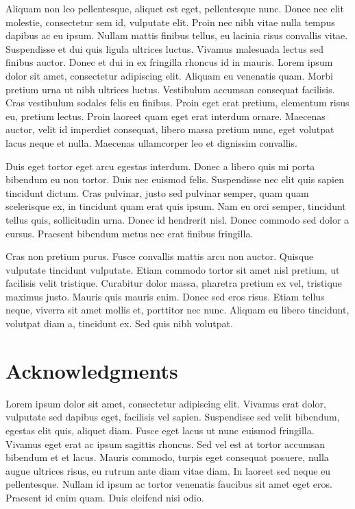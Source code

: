 \documentclass[11pt,english,]{memoir}
\begin{document}
Aliquam non leo pellentesque, aliquet est eget, pellentesque nunc. Donec nec elit molestie, consectetur sem id, vulputate elit. Proin nec nibh vitae nulla tempus dapibus ac eu ipsum. Nullam mattis finibus tellus, eu lacinia risus convallis vitae. Suspendisse et dui quis ligula ultrices luctus. Vivamus malesuada lectus sed finibus auctor. Donec et dui in ex fringilla rhoncus id in mauris. Lorem ipsum dolor sit amet, consectetur adipiscing elit. Aliquam eu venenatis quam. Morbi pretium urna ut nibh ultrices luctus. Vestibulum accumsan consequat facilisis. Cras vestibulum sodales felis eu finibus. Proin eget erat pretium, elementum risus eu, pretium lectus. Proin laoreet quam eget erat interdum ornare. Maecenas auctor, velit id imperdiet consequat, libero massa pretium nunc, eget volutpat lacus neque et nulla. Maecenas ullamcorper leo et dignissim convallis.

Duis eget tortor eget arcu egestas interdum. Donec a libero quis mi porta bibendum eu non tortor. Duis nec euismod felis. Suspendisse nec elit quis sapien tincidunt dictum. Cras pulvinar, justo sed pulvinar semper, quam quam scelerisque ex, in tincidunt quam erat quis ipsum. Nam eu orci semper, tincidunt tellus quis, sollicitudin urna. Donec id hendrerit nisl. Donec commodo sed dolor a cursus. Praesent bibendum metus nec erat finibus fringilla.

Cras non pretium purus. Fusce convallis mattis arcu non auctor. Quisque vulputate tincidunt vulputate. Etiam commodo tortor sit amet nisl pretium, ut facilisis velit tristique. Curabitur dolor massa, pharetra pretium ex vel, tristique maximus justo. Mauris quis mauris enim. Donec sed eros risus. Etiam tellus neque, viverra sit amet mollis et, porttitor nec nunc. Aliquam eu libero tincidunt, volutpat diam a, tincidunt ex. Sed quis nibh volutpat.

\hypertarget{acknowledgments}{%
\chapter*{Acknowledgments}\label{acknowledgments}}


Lorem ipsum dolor sit amet, consectetur adipiscing elit. Vivamus erat dolor, vulputate sed dapibus eget, facilisis vel sapien. Suspendisse sed velit bibendum, egestas elit quis, aliquet diam. Fusce eget lacus ut nunc euismod fringilla. Vivamus eget erat ac ipsum sagittis rhoncus. Sed vel est at tortor accumsan bibendum et et lacus. Mauris commodo, turpis eget consequat posuere, nulla augue ultrices risus, eu rutrum ante diam vitae diam. In laoreet sed neque eu pellentesque. Nullam id ipsum ac tortor venenatis faucibus sit amet eget eros. Praesent id enim quam. Duis eleifend nisi odio.
\end{document}
